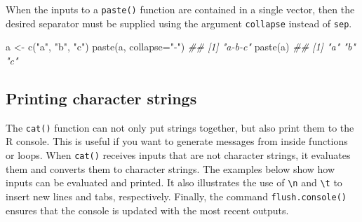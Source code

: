 \documentclass[
  13,
  letterpaper,
]{report}
\newenvironment{Shaded}{\begin{snugshade}}{\end{snugshade}}
\newcommand{\AttributeTok}[1]{\textcolor[rgb]{0.40,0.45,0.13}{#1}}
\newcommand{\DocumentationTok}[1]{\textcolor[rgb]{0.37,0.37,0.37}{\textit{#1}}}
\newcommand{\FunctionTok}[1]{\textcolor[rgb]{0.28,0.35,0.67}{#1}}
\newcommand{\NormalTok}[1]{\textcolor[rgb]{0.00,0.23,0.31}{#1}}
\newcommand{\OtherTok}[1]{\textcolor[rgb]{0.00,0.23,0.31}{#1}}
\newcommand{\StringTok}[1]{\textcolor[rgb]{0.13,0.47,0.30}{#1}}
\begin{document}
When the inputs to a \texttt{paste()} function are contained in a single
vector, then the desired separator must be supplied using the argument
\texttt{collapse} instead of \texttt{sep}.

\begin{Shaded}
\begin{Highlighting}[]

\NormalTok{a }\OtherTok{\textless{}{-}} \FunctionTok{c}\NormalTok{(}\StringTok{"a"}\NormalTok{, }\StringTok{"b"}\NormalTok{, }\StringTok{"c"}\NormalTok{)}
\FunctionTok{paste}\NormalTok{(a, }\AttributeTok{collapse=}\StringTok{"{-}"}\NormalTok{)}
\DocumentationTok{\#\# [1] "a{-}b{-}c"}
\FunctionTok{paste}\NormalTok{(a)}
\DocumentationTok{\#\# [1] "a" "b" "c"}
\end{Highlighting}
\end{Shaded}

\subsection{Printing character strings}\label{sec-manip-char-print}

The \texttt{cat()} function can not only put strings together, but also
print them to the R console. This is useful if you want to generate
messages from inside functions or loops. When \texttt{cat()} receives
inputs that are not character strings, it evaluates them and converts
them to character strings. The examples below show how inputs can be
evaluated and printed. It also illustrates the use of
\texttt{\textbackslash{}n} and \texttt{\textbackslash{}t} to insert new
lines and tabs, respectively. Finally, the command
\texttt{flush.console()} ensures that the console is updated with the
most recent outputs.
\end{document}
